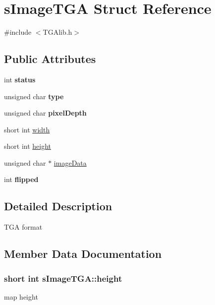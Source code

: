 \hypertarget{structs_image_t_g_a}{\section{s\-Image\-T\-G\-A Struct Reference}
\label{structs_image_t_g_a}
}


{\ttfamily \#include $<$T\-G\-Alib.\-h$>$}

\subsection*{Public Attributes}
\begin{DoxyCompactItemize}
\item 
\hypertarget{structs_image_t_g_a_a58c4256c045f6bbdbe5dc6a528dce04d}{int {\bfseries status}}\label{structs_image_t_g_a_a58c4256c045f6bbdbe5dc6a528dce04d}

\item 
\hypertarget{structs_image_t_g_a_ad4ff6304c06ac0abfbcc7f8076f3779e}{unsigned char {\bfseries type}}\label{structs_image_t_g_a_ad4ff6304c06ac0abfbcc7f8076f3779e}

\item 
\hypertarget{structs_image_t_g_a_a9ade65dd30b729fe990ebfcb844905de}{unsigned char {\bfseries pixel\-Depth}}\label{structs_image_t_g_a_a9ade65dd30b729fe990ebfcb844905de}

\item 
short int \hyperlink{structs_image_t_g_a_a1b463569e691f02be0f05d0e095bef19}{width}
\item 
short int \hyperlink{structs_image_t_g_a_a381563989593a42392f557a95fd0a4f6}{height}
\item 
unsigned char $\ast$ \hyperlink{structs_image_t_g_a_a71375192650ba847a14e1d86988952a8}{image\-Data}
\item 
\hypertarget{structs_image_t_g_a_ae0197507d453383dce7c65302a8a6102}{int {\bfseries flipped}}\label{structs_image_t_g_a_ae0197507d453383dce7c65302a8a6102}

\end{DoxyCompactItemize}


\subsection{Detailed Description}
T\-G\-A format 

\subsection{Member Data Documentation}
\hypertarget{structs_image_t_g_a_a381563989593a42392f557a95fd0a4f6}{
\subsubsection[{height}]{\setlength{\rightskip}{0pt plus 5cm}short int {\bf s\-Image\-T\-G\-A\-::height}}}\label{structs_image_t_g_a_a381563989593a42392f557a95fd0a4f6}
map height 


